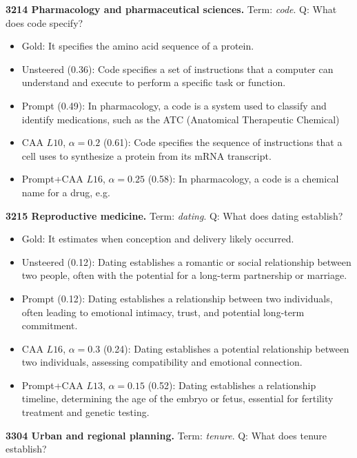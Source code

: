 \medskip\noindent\textbf{3214 Pharmacology and pharmaceutical sciences.} Term: \emph{code}.
Q: What does code specify?
\begin{itemize}\setlength{\itemsep}{0.15em}\setlength{\parsep}{0pt}\setlength{\topsep}{0.2em}
\item Gold: It specifies the amino acid sequence of a protein.
\item Unsteered (0.36): Code specifies a set of instructions that a computer can understand and execute to perform a specific task or function.
\item Prompt (0.49): In pharmacology, a code is a system used to classify and identify medications, such as the ATC (Anatomical Therapeutic Chemical)
\item CAA $L10$, $\alpha=0.2$ (0.61): Code specifies the sequence of instructions that a cell uses to synthesize a protein from its mRNA transcript.
\item Prompt+CAA $L16$, $\alpha=0.25$ (0.58): In pharmacology, a code is a chemical name for a drug, e.g.
\end{itemize}
\medskip\noindent\textbf{3215 Reproductive medicine.} Term: \emph{dating}.
Q: What does dating establish?
\begin{itemize}\setlength{\itemsep}{0.15em}\setlength{\parsep}{0pt}\setlength{\topsep}{0.2em}
\item Gold: It estimates when conception and delivery likely occurred.
\item Unsteered (0.12): Dating establishes a romantic or social relationship between two people, often with the potential for a long-term partnership or marriage.
\item Prompt (0.12): Dating establishes a relationship between two individuals, often leading to emotional intimacy, trust, and potential long-term commitment.
\item CAA $L16$, $\alpha=0.3$ (0.24): Dating establishes a potential relationship between two individuals, assessing compatibility and emotional connection.
\item Prompt+CAA $L13$, $\alpha=0.15$ (0.52): Dating establishes a relationship timeline, determining the age of the embryo or fetus, essential for fertility treatment and genetic testing.
\end{itemize}
\medskip\noindent\textbf{3304 Urban and regional planning.} Term: \emph{tenure}.
Q: What does tenure establish?

